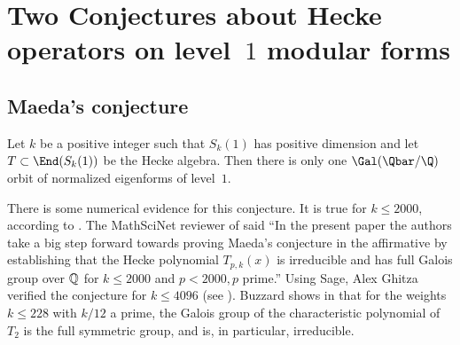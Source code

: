 \documentclass{report}
\begin{document}





\section{Two Conjectures about Hecke operators on level~$1$ modular forms}

\subsection{Maeda's conjecture}\label{sec:maeda_conj}

\begin{conjecture}[Maeda]
Let $k$ be a positive integer such that $S_k(1)$ has positive
dimension and let $T\subset \End(S_k(1))$ be the Hecke algebra.
Then there is only one $\Gal(\Qbar/\Q)$ orbit of normalized
eigenforms of level~$1$.
\end{conjecture}
There is some numerical evidence for this conjecture.  It is true
for $k\leq 2000$, according to \cite{farmer-james:maeda}.
The MathSciNet reviewer of \cite{farmer-james:maeda} said
``In the present paper the authors take a big step forward towards
proving Maeda's conjecture in the affirmative by establishing that
the Hecke polynomial $T_{p,k}(x)$ is irreducible and has full
Galois group over $\Bbb Q$ for $k\le2000$ and $p<2000, p$ prime.''
Using Sage, Alex Ghitza verified the conjecture for $k\leq 4096$ (see
\cite{ghitza:maeda}).  Buzzard shows in \cite{buzzard:t2} that for the
weights $k\leq 228$ with $k/12$ a prime, the Galois group of the
characteristic polynomial of $T_2$ is the full symmetric group, and
is, in particular, irreducible.
\end{document}
